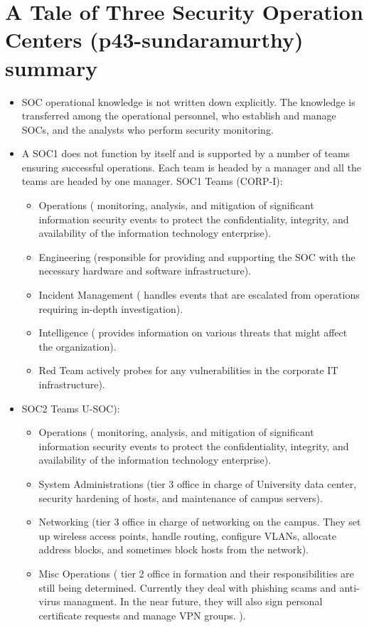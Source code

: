 \documentclass[14pt]{article}
\begin{document}
	\section{A Tale of Three Security Operation Centers (p43-sundaramurthy) summary}
	\begin{itemize}
	\item  SOC operational knowledge is not written down explicitly. The knowledge is transferred among the operational personnel, who establish and manage SOCs, and the analysts who perform security monitoring.
	\item A SOC1 does not function by itself and is supported by a number of teams ensuring successful operations. Each team is headed by a manager and all the teams are headed by one manager. SOC1 Teams (CORP-I):
		\begin{itemize}
		\item Operations ( monitoring, analysis, and mitigation of signiﬁcant information security events to protect the conﬁdentiality, integrity, and availability of the information technology enterprise).
		\item Engineering (responsible for providing and supporting the SOC with the necessary hardware and software infrastructure).
		\item Incident Management ( handles events that are escalated from operations requiring in-depth investigation).
		\item Intelligence ( provides information on various threats that might aﬀect the organization).
		\item Red Team  actively probes for any vulnerabilities in the corporate IT infrastructure).
		\end{itemize}
	\item SOC2 Teams U-SOC):
		\begin{itemize}
		\item Operations ( monitoring, analysis, and mitigation of signiﬁcant information security events to protect the conﬁdentiality, integrity, and availability of the information technology enterprise).
		\item System Administrations (tier 3 oﬃce in charge of University data center, security hardening of hosts, and maintenance of campus servers).
		\item Networking (tier 3 oﬃce in charge of networking on the campus. They set up wireless access points, handle routing, conﬁgure VLANs, allocate address blocks, and sometimes block hosts from the network).
		\item Misc Operations ( tier 2 oﬃce in formation and their responsibilities are still being determined. Currently they deal with phishing scams and anti-virus managment. In the near future, they will also sign personal certiﬁcate requests and manage VPN groups. ).

\end{itemize}
\end{itemize}
\end{document}
